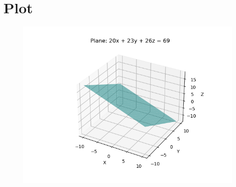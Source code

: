 \documentclass[12pt]{article}
\begin{document}
\section*{Plot}
\begin{figure}[H]
    \centering
    \includegraphics[width=1\columnwidth]{Figs/Figure.png}
\end{figure}
\end{document}
